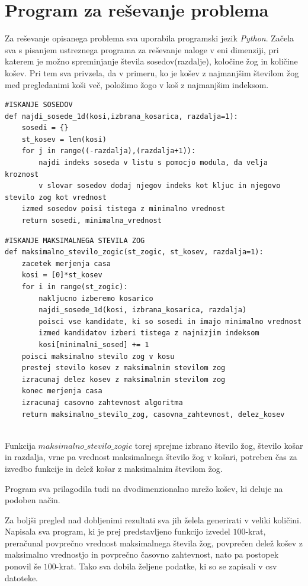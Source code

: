 \documentclass[a4paper, 11pt]{article}
\begin{document}
\section{Program za reševanje problema}
Za reševanje opisanega problema sva uporabila programski jezik \emph{Python}. Začela sva s pisanjem ustreznega programa za reševanje
naloge v eni dimenziji, pri katerem je možno spreminjanje števila sosedov(razdalje), koločine žog in količine košev. Pri tem sva privzela, da v
primeru, ko je košev z najmanjšim številom žog med pregledanimi koši več, položimo žogo v koš z najmanjšim indeksom. 

\begin{Verbatim}[breaklines=true]
#ISKANJE SOSEDOV
def najdi_sosede_1d(kosi,izbrana_kosarica, razdalja=1):
    sosedi = {}
    st_kosev = len(kosi)
    for j in range((-razdalja),(razdalja+1)):
        najdi indeks soseda v listu s pomocjo modula, da velja kroznost
        v slovar sosedov dodaj njegov indeks kot kljuc in njegovo stevilo zog kot vrednost
    izmed sosedov poisi tistega z minimalno vrednost
    return sosedi, minimalna_vrednost
\end{Verbatim}

\pagebreak
\begin{Verbatim}[breaklines=true]
#ISKANJE MAKSIMALNEGA STEVILA ZOG
def maksimalno_stevilo_zogic(st_zogic, st_kosev, razdalja=1):
    zacetek merjenja casa
    kosi = [0]*st_kosev
    for i in range(st_zogic):
        nakljucno izberemo kosarico
        najdi_sosede_1d(kosi, izbrana_kosarica, razdalja)
        poisci vse kandidate, ki so sosedi in imajo minimalno vrednost
        izmed kandidatov izberi tistega z najnizjim indeksom
        kosi[minimalni_sosed] += 1 
    poisci maksimalno stevilo zog v kosu
    prestej stevilo kosev z maksimalnim stevilom zog
    izracunaj delez kosev z maksimalnim stevilom zog
    konec merjenja casa
    izracunaj casovno zahtevnost algoritma
    return maksimalno_stevilo_zog, casovna_zahtevnost, delez_kosev


\end{Verbatim}

Funkcija $maksimalno\_stevilo\_zogic$ torej sprejme izbrano število žog, število košar in razdalja, vrne pa vrednost maksimalnega število žog v košari,
potreben čas za izvedbo funkcije in delež košar z maksimalnim številom žog.

Program sva prilagodila tudi na dvodimenzionalno mrežo košev, ki deluje na podoben način.
\bigbreak

Za boljši pregled nad dobljenimi rezultati sva jih želela generirati v veliki količini.
Napisala sva program, ki je prej predstavljeno funkcijo izvedel $100$-krat, preračunal povprečno vrednost maksimalnega števila žog, povprečen delež košev z maksimalno vrednostjo
in povprečno časovno zahtevnost, nato pa postopek ponovil še $100$-krat. 
Tako sva dobila željene podatke, ki so se zapisali v csv datoteke. 
\end{document}
